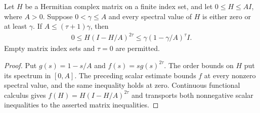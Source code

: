 \begin{lemma}
    \label{lem:matrix_gap_energy_weighted_power}
    \leanok
    Let $H$ be a Hermitian complex matrix on a finite index set, and
    let $0\leq H\leq AI$, where $A>0$. Suppose $0<\gamma\leq A$ and
    every spectral value of $H$ is either zero or at least $\gamma$.
    If $A\leq(\tau+1)\gamma$, then
    \begin{align}
        0\leq H(I-H/A)^{2\tau}
        \leq\gamma(1-\gamma/A)^\tau I.
    \end{align}
    Empty matrix index sets and $\tau=0$ are permitted.
\end{lemma}
\begin{proof}\leanok
    Put $g(s)=1-s/A$ and $f(s)=sg(s)^{2\tau}$. The order bounds
    on $H$ put its spectrum in $[0,A]$. The preceding scalar estimate
    bounds $f$ at every nonzero spectral value, and the same inequality
    holds at zero. Continuous functional calculus gives
    $f(H)=H(I-H/A)^{2\tau}$ and transports both nonnegative scalar
    inequalities to the asserted matrix inequalities.
\end{proof}
